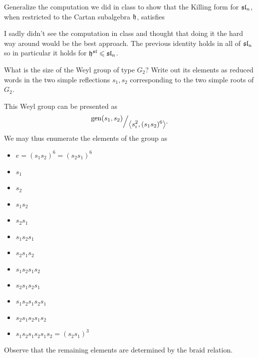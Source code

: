 \documentclass[12pt]{memoir}
\begin{document}
\begin{Ej}[Exercise 5]
    Generalize the computation we did in class to show that the Killing form for $\mathfrak{sl}_n$, when
restricted to the Cartan subalgebra $\mathfrak{h}$, satisfies
\end{Ej}

\begin{ptcbr}
    I sadly didn't see the computation in class and thought that doing it the hard way around would be the best approach. The previous identity holds in all of $\mathfrak{sl}_n$ so in particular it holds for $\mathfrak{h}^{\mathfrak{sl}}\leqslant \mathfrak{sl}_n$.
\end{ptcbr}
\begin{Ej}[Exercise 9]
    What is the size of the Weyl group of type $G_2$? Write out its elements as reduced words in
    the two simple reflections $s_1, s_2$ corresponding to the two simple roots of $G_2$.
\end{Ej}

\begin{ptcbr}
This Weyl group can be presented as
$$\quot{\gen(s_1,s_2)}{\genr{s_i^2,(s_1s_2)^6}}.$$
We may thus enumerate the elements of the group as 
\begin{multicols}{2}
    \begin{itemize}
        \item $e=(s_1s_2)^6=(s_2s_1)^6$
        \item $s_1$
        \item $s_2$
        \iffalse
        \item $s_1^{-1}=s_2(s_1s_2)^5$
        \item $s_2^{-1}=s_1(s_2s_1)^5$
        \fi
        \item $s_1s_2$
        \item $s_2s_1$
        \iffalse
        \item $(s_1s_2)^{-1}=(s_1s_2)^5$
        \item $(s_2s_1)^{-1}=(s_2s_1)^5$
        \fi
        \item $s_1s_2s_1$
        \item $s_2s_1s_2$
        \iffalse
        \item $(s_1s_2s_1)^{-1}=(s_2s_1s_2)(s_1s_2)^3$
        \item $(s_2s_1s_2)^{-1}=(s_1s_2s_1)(s_2s_1)^3$
        \fi
        \item $s_1s_2s_1s_2$
        \item $s_2s_1s_2s_1$
        \iffalse
        \item $(s_1s_2s_1s_2)^{-1}=(s_1s_2)^4$
        \item $(s_2s_1s_2s_1)^{-1}=(s_2s_1)^4$
        \fi
        \item $s_1s_2s_1s_2s_1$
        \item $s_2s_1s_2s_1s_2$
        \iffalse
        \item $(s_1s_2s_1s_2s_1)^{-1}=s_2(s_1s_2)^3$
        \item $(s_2s_1s_2s_1s_2)^{-1}=s_1(s_2s_1)^3$
        \fi
        \item $s_1s_2s_1s_2s_1s_2=(s_2s_1)^3$
    \end{itemize}
\end{multicols}
Observe that the remaining elements are determined by the braid relation.
\end{ptcbr}
\end{document}
